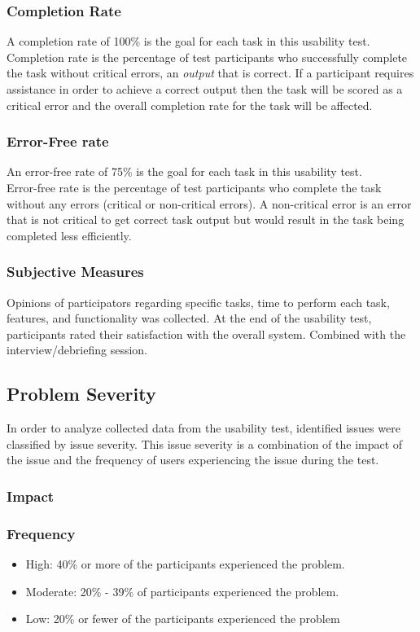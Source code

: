 \subsubsection{Completion Rate}
A completion rate of 100\% is the goal for each task in this usability test. \\
Completion rate is the percentage of test participants who successfully complete the task without critical errors, an \emph{output} that is correct. If a participant requires assistance in order to achieve a correct output then the task will be scored as a critical error and the overall completion rate for the task will be affected.

\subsubsection{Error-Free rate}
An error-free rate of 75\% is the goal for each task in this usability test. \\
Error-free rate is the percentage of test participants who complete the task without any errors (critical or non-critical errors). A non-critical error is an error that is not critical to get correct task output but would result in the task being completed less efficiently.

\subsubsection{Subjective Measures}
Opinions of participators regarding specific tasks, time to perform each task, features, and functionality was collected. At the end of the usability test, participants rated their satisfaction with the overall system. Combined with the interview/debriefing session. 

\subsection{Problem Severity}
In order to analyze collected data from the usability test, identified issues were classified by issue severity. This issue severity is a combination of the impact of the issue and the frequency of users experiencing the issue during the test. 

\subsubsection{Impact}
\subsubsection{Frequency}
	\begin{itemize}
		\item High: 40\% or more of the participants experienced the problem.
		\item Moderate: 20\% - 39\% of participants experienced the problem.
		\item Low: 20\% or fewer of the participants experienced the problem
	\end{itemize}
